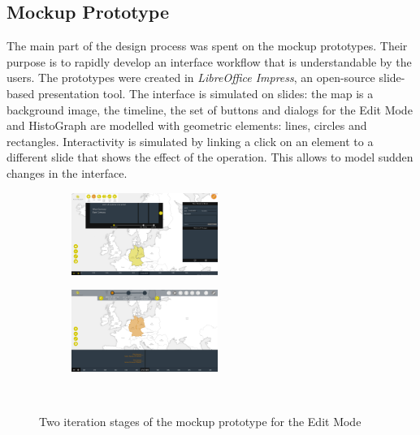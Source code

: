 
\subsection{Mockup Prototype} %
\label{sub:mockup_prototype}

The main part of the design process was spent on the mockup prototypes. Their purpose is to rapidly develop an interface workflow that is understandable by the users. The prototypes were created in \emph{LibreOffice Impress}, an open-source slide-based presentation tool. The interface is simulated on slides: the map is a background image, the timeline, the set of buttons and dialogs for the Edit Mode and HistoGraph are modelled with geometric elements: lines, circles and rectangles. Interactivity is simulated by linking a click on an element to a different slide that shows the effect of the operation. This allows to model sudden changes in the interface.

\begin{figure}[ht]
  \vspace{1em}
  \centering
  \begin{subfigure}[b]{.5\textwidth}
    \centering
    \includegraphics[width=180px]{graphics/development/user_interface_design_process/mockup_prototype_1.png}
  \end{subfigure}%
  \begin{subfigure}[b]{.5\textwidth}
    \centering
    \includegraphics[width=180px]{graphics/development/user_interface_design_process/mockup_prototype_3.png}
  \end{subfigure} \\[0.8em]
  \caption{Two iteration stages of the mockup prototype for the Edit Mode}
  \label{fig:mockup_prototypes}
\end{figure}

